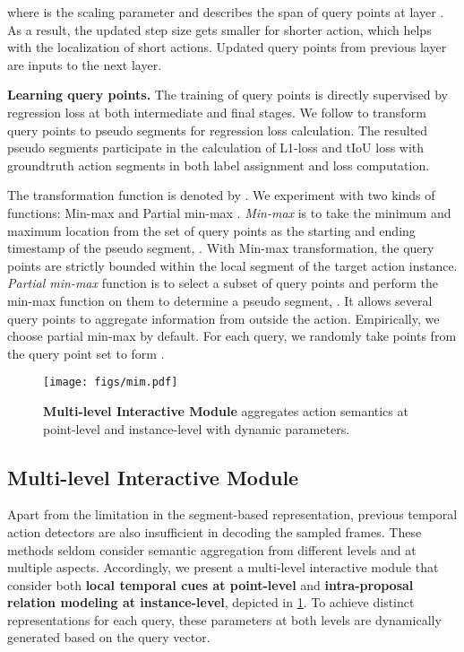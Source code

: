 \documentclass{article}
\renewcommand{\paragraph}[1]{\vspace{1.25mm}\noindent\textbf{#1}}
\begin{document}
where  is the scaling parameter and describes the span of query points at layer . As a result, the updated step size gets smaller for shorter action, which helps with the localization of short actions. Updated query points from previous layer are inputs to the next layer. 

\paragraph{Learning query points.} 
The training of query points is directly supervised by regression loss at both intermediate and final stages. We follow \cite{DBLP:conf/iccv/YangLHWL19} to transform query points to pseudo segments for regression loss calculation. The resulted pseudo segments participate in the calculation of L1-loss and tIoU loss with groundtruth action segments in both label assignment and loss computation. 

The transformation function is denoted by . We experiment with two kinds of functions: Min-max  and Partial min-max .  {\em Min-max} is to take the minimum and maximum location from the set of query points as the starting and ending timestamp of the pseudo segment, . With Min-max transformation, the query points are strictly bounded within the local segment of the target action instance. {\em Partial min-max} function is to select a subset of query points  and perform the min-max function on them to determine a pseudo segment, .
It allows several query points to aggregate information from outside the action. Empirically, we choose partial min-max by default. For each query, we randomly take  points from the query point set to form . 

\begin{figure}[t]
  \centering
  \texttt{[image: figs/mim.pdf]}
  \caption{{\bf Multi-level Interactive Module} aggregates action semantics at point-level and instance-level with dynamic parameters. }
  \vspace{-2mm}
  \label{fig:mim}
\end{figure}

\subsection{Multi-level Interactive Module}
\label{sec:mim}
Apart from the limitation in the segment-based representation, previous temporal action detectors are also insufficient in decoding the sampled frames. 
These methods seldom consider semantic aggregation from different levels and at multiple aspects. Accordingly, we present a multi-level interactive module that consider both {\bf local temporal cues at point-level} and {\bf intra-proposal relation modeling at instance-level}, depicted in \cref{fig:mim}. To achieve distinct representations for each query, these parameters at both levels are dynamically generated based on the query vector.
\end{document}
